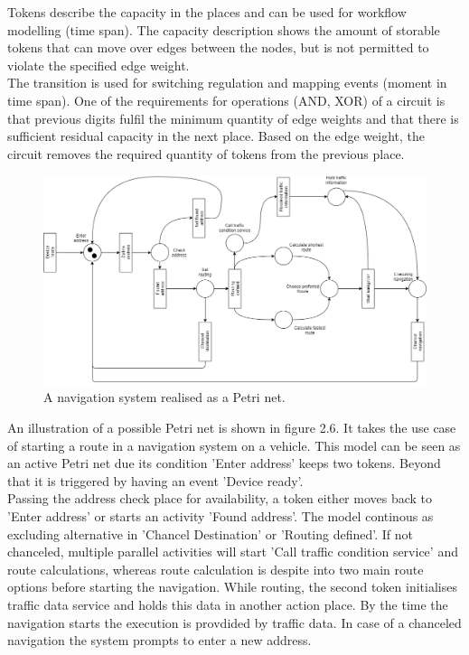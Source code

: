 Tokens describe the capacity in the places and can be used for workflow modelling (time span). The capacity description shows the amount of storable tokens that can move over edges between the nodes, but is not permitted to violate the specified edge weight. \\
The transition is used for switching regulation and mapping events (moment in time span). One of the requirements for operations (AND, XOR) of a circuit is that previous digits fulfil the minimum quantity of edge weights and that there is sufficient residual capacity in the next place. Based on the edge weight, the circuit removes the required quantity of tokens from the previous place. \cite{Bernroider.2006}


\begin{figure}[!hb]
	\centering
	\includegraphics[scale=0.35]{PETRI-NET}
	\caption{A navigation system realised as a Petri net.}
\end{figure}

An illustration of a possible Petri net is shown in figure 2.6. It takes the use case of starting a route in a navigation system on a vehicle. This model can be seen as an active Petri net due its condition 'Enter address' keeps two tokens. Beyond that it is triggered by having an event 'Device ready'. \\
Passing the address check place for availability, a token either moves back to 'Enter address' or starts an activity 'Found address'. The model continous as excluding alternative in 'Chancel Destination' or 'Routing defined'. If not chanceled, multiple parallel activities will start 'Call traffic condition service' and route calculations, whereas route calculation is despite into two main route options before starting the navigation. While routing, the second token initialises traffic data service and holds this data in another action place. By the time the navigation starts the execution is provdided by traffic data. In case of a chanceled navigation the system prompts to enter a new address.


